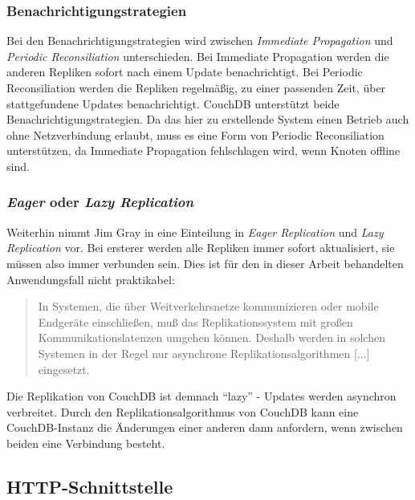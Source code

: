 \subsubsection{Benachrichtigungstrategien}

Bei den Benachrichtigungstrategien  wird zwischen \textit{Immediate Propagation} und \textit{Periodic Reconsiliation} unterschieden. Bei Immediate Propagation werden die anderen Repliken sofort nach einem Update benachrichtigt. Bei Periodic Reconsiliation werden die Repliken regelmäßig, zu einer passenden Zeit, über stattgefundene Updates benachrichtigt. CouchDB unterstützt beide Benachrichtigungstrategien. Da das hier zu erstellende System einen Betrieb auch ohne Netzverbindung erlaubt, muss es eine Form von Periodic Reconsiliation unterstützen, da Immediate Propagation fehlschlagen wird, wenn Knoten offline sind. 

\subsubsection{\textit{Eager} oder \textit{Lazy Replication}}

Weiterhin nimmt Jim Gray in  eine Einteilung in \textit{Eager Replication} und \textit{Lazy Replication} vor. Bei ersterer werden alle Repliken immer sofort aktualisiert, sie müssen also immer verbunden sein. Dies ist für den in dieser Arbeit behandelten Anwendungsfall nicht praktikabel:

\begin{quote}
In Systemen, die über Weitverkehrsnetze kommunizieren oder mobile Endgeräte einschließen, muß das Replikationssystem mit großen Kommunikationslatenzen umgehen können. Deshalb werden in solchen Systemen in der Regel nur asynchrone Replikationsalgorithmen [...] eingesetzt. 
\end{quote}

Die Replikation von CouchDB ist demnach \enquote{lazy} - Updates werden asynchron verbreitet. Durch den Replikationsalgorithmus von CouchDB kann eine CouchDB-Instanz die Änderungen einer anderen dann anfordern, wenn zwischen beiden eine Verbindung besteht.






\subsection{HTTP-Schnittstelle}
\label{subsec:rest}


